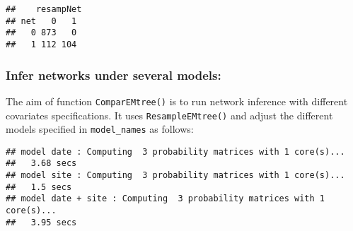 \begin{Shaded}
\begin{Highlighting}[]
\OperatorTok{\$}\OperatorTok{/}
\OperatorTok{*}\OperatorTok{>}\NormalTok{)}
\end{Highlighting}
\end{Shaded}

\begin{verbatim}
##    resampNet
## net   0   1
##   0 873   0
##   1 112 104
\end{verbatim}

\subsubsection{Infer networks under several
models:}\label{infer-networks-under-several-models}

The aim of function \texttt{ComparEMtree()} is to run network inference
with different covariates specifications. It uses
\texttt{ResampleEMtree()} and adjust the different models specified in
\texttt{model\_names} as follows:

\begin{Shaded}
\begin{Highlighting}[]
\NormalTok{(}\NormalTok{,}\NormalTok{,}\NormalTok{(}\NormalTok{,}\NormalTok{))}
\NormalTok{(}\NormalTok{,}\NormalTok{,}\NormalTok{)}
\OperatorTok{/}\NormalTok{,  }\NormalTok{, }\NormalTok{,}\NormalTok{,}\NormalTok{)}
\end{Highlighting}
\end{Shaded}

\begin{verbatim}
## model date : Computing  3 probability matrices with 1 core(s)... 
##   3.68 secs
## model site : Computing  3 probability matrices with 1 core(s)... 
##   1.5 secs
## model date + site : Computing  3 probability matrices with 1 core(s)... 
##   3.95 secs
\end{verbatim}


